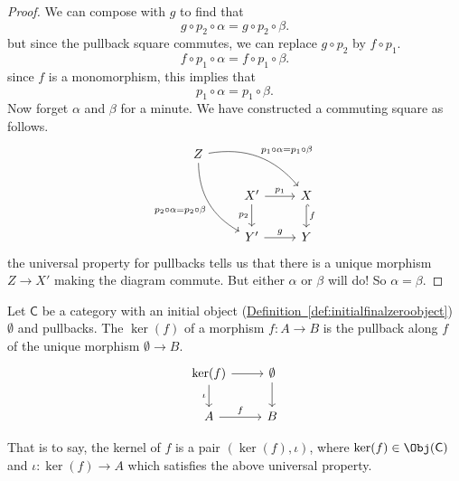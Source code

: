 \documentclass[notes.tex]{subfiles}
\begin{document}
\begin{proof}
  We can compose with $g$ to find that
  \begin{equation*}
    g \circ p_{2} \circ \alpha = g \circ p_{2} \circ \beta.
  \end{equation*}
  but since the pullback square commutes, we can replace $g \circ p_{2}$ by $f \circ p_{1}$.
  \begin{equation*}
    f \circ p_{1} \circ \alpha = f \circ p_{1} \circ \beta.
  \end{equation*}
  since $f$ is a monomorphism, this implies that
  \begin{equation*}
    p_{1} \circ \alpha = p_{1} \circ \beta.
  \end{equation*}
  Now forget $\alpha$ and $\beta$ for a minute. We have constructed a commuting square as follows.
  \begin{equation*}
    \begin{tikzcd}
      Z
      \arrow[drr, bend left, "p_{1} \circ \alpha = p_{1} \circ \beta"]
      \arrow[ddr, swap, bend right, "p_{2} \circ \alpha = p_{2} \circ \beta"]
      \\
      & X'
      \arrow[r, "p_{1}"]
      \arrow[d, swap, "p_{2}"]
      & X
      \arrow[d, hookrightarrow, "f"]
      \\
      & Y'
      \arrow[r, "g"]
      & Y
    \end{tikzcd}
  \end{equation*}
  the universal property for pullbacks tells us that there is a unique morphism $Z \to X'$ making the diagram commute. But either $\alpha$ or $\beta$ will do! So $\alpha = \beta$.
\end{proof}

\begin{definition}
  \label{def:kernelofmorphism}
  Let $\mathsf{C}$ be a category with an initial object (\hyperref[def:initialfinalzeroobject]{Definition~\ref*{def:initialfinalzeroobject}}) $\emptyset$ and pullbacks. The  $\ker(f)$ of a morphism $f\colon A \to B$ is the pullback along $f$ of the unique morphism $\emptyset \to B$.
  \begin{equation*}
    \begin{tikzcd}
      \ker(f) \arrow[d, swap, "\iota"] \arrow[r] & \emptyset \arrow[d] \\
      A \arrow[r, "f"] & B
    \end{tikzcd}
  \end{equation*}

  That is to say, the kernel of $f$ is a pair $(\ker(f), \iota)$, where $\ker(f) \in \Obj(\mathsf{C})$ and $\iota\colon \ker(f) \to A$ which satisfies the above universal property.
\end{definition}
\end{document}
